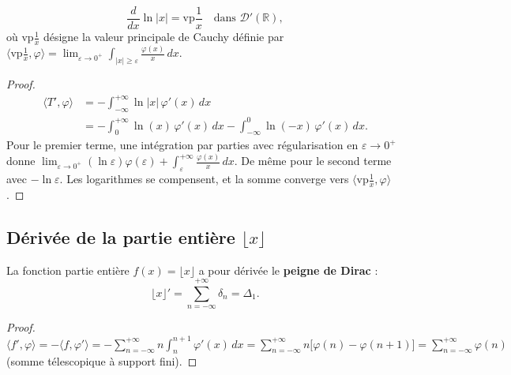 \documentclass[12pt,a4paper,openany]{book}
\theoremstyle{definition}
\theoremstyle{plain}
\theoremstyle{remark}
\begin{document}
	\begin{proposition}
		\[
		\frac{d}{dx}\ln|x| = \mathrm{vp}\frac{1}{x} \quad \text{dans } \mathcal{D}'(\mathbb{R}),
		\]
		où $\mathrm{vp}\frac{1}{x}$ désigne la valeur principale de Cauchy définie par
		$\langle \mathrm{vp}\frac{1}{x}, \varphi\rangle = \lim_{\varepsilon\to 0^+}\int_{|x|\geq\varepsilon}\frac{\varphi(x)}{x}\,dx$.
	\end{proposition}
	
	\begin{proof}
		\begin{align*}
			\langle T', \varphi\rangle
			&= -\int_{-\infty}^{+\infty}\ln|x|\,\varphi'(x)\,dx \\
			&= -\int_0^{+\infty}\ln(x)\,\varphi'(x)\,dx - \int_{-\infty}^0\ln(-x)\,\varphi'(x)\,dx.
		\end{align*}
		Pour le premier terme, une intégration par parties avec régularisation en $\varepsilon \to 0^+$ donne $\lim_{\varepsilon\to 0^+}(\ln\varepsilon)\varphi(\varepsilon) + \int_\varepsilon^{+\infty}\frac{\varphi(x)}{x}\,dx$. De même pour le second terme avec $-\ln\varepsilon$. Les logarithmes se compensent, et la somme converge vers $\langle\mathrm{vp}\frac{1}{x}, \varphi\rangle$.
	\end{proof}
	
	\subsection{Dérivée de la partie entière \texorpdfstring{$\lfloor x\rfloor$}{[x]}}
	
	\begin{proposition}
		La fonction partie entière $f(x) = \lfloor x\rfloor$ a pour dérivée le \textbf{peigne de Dirac} :
		\[
		\lfloor x\rfloor' = \sum_{n=-\infty}^{+\infty} \delta_n = \Delta_1.
		\]
	\end{proposition}
	
	\begin{proof}
		$\langle f', \varphi\rangle = -\langle f, \varphi'\rangle = -\displaystyle\sum_{n=-\infty}^{+\infty} n\int_n^{n+1}\varphi'(x)\,dx = \displaystyle\sum_{n=-\infty}^{+\infty} n\bigl[\varphi(n)-\varphi(n+1)\bigr] = \displaystyle\sum_{n=-\infty}^{+\infty}\varphi(n)$ (somme télescopique à support fini).
	\end{proof}
	
\end{document}
